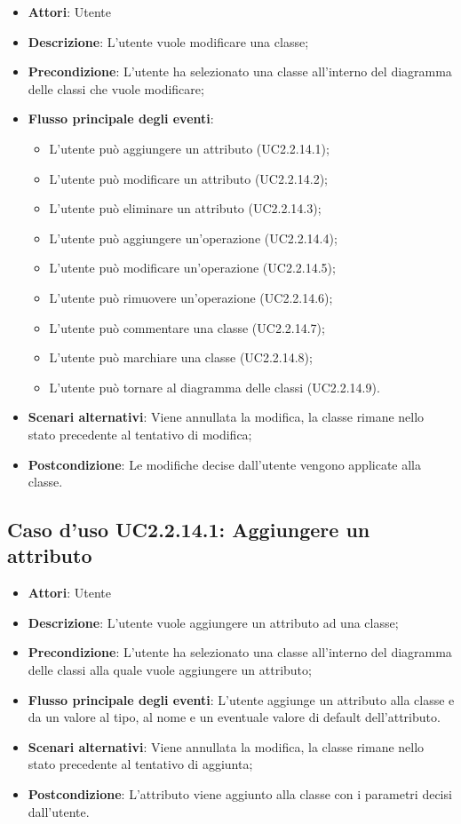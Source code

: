 \documentclass[../AnalisiDeiRequisiti.tex]{subfiles}
\begin{document}
			\begin{itemize}
				\item \textbf{Attori}: Utente
				\item \textbf{Descrizione}: L'utente vuole modificare una classe;
				\item \textbf{Precondizione}: L'utente ha selezionato una classe all'interno del diagramma delle classi che vuole modificare;
				\item \textbf{Flusso principale degli eventi}: \begin{itemize}
					\item L'utente può aggiungere un attributo (UC2.2.14.1);
					\item L'utente può modificare un attributo (UC2.2.14.2);
					\item L'utente può eliminare un attributo (UC2.2.14.3);
					\item L'utente può aggiungere un'operazione (UC2.2.14.4);
					\item L'utente può modificare un'operazione (UC2.2.14.5);
					\item L'utente può rimuovere un'operazione (UC2.2.14.6);
					\item L'utente può commentare una classe (UC2.2.14.7);
					\item L'utente può marchiare una classe (UC2.2.14.8);
					\item L'utente può tornare al diagramma delle classi (UC2.2.14.9).
				\end{itemize}
				\item \textbf{Scenari alternativi}: Viene annullata la modifica, la classe rimane nello stato precedente al tentativo di modifica;
				\item \textbf{Postcondizione}: Le modifiche decise dall'utente vengono applicate alla classe.
			\end{itemize}
			\subsection{Caso d'uso UC2.2.14.1: Aggiungere un attributo}
			\begin{itemize}
				\item \textbf{Attori}: Utente
				\item \textbf{Descrizione}: L'utente vuole aggiungere un attributo ad una classe;
				\item \textbf{Precondizione}: L'utente ha selezionato una classe all'interno del diagramma delle classi alla quale vuole aggiungere un attributo;
				\item \textbf{Flusso principale degli eventi}: L'utente aggiunge un attributo alla classe e da un valore al tipo, al nome e un eventuale valore di default dell'attributo. 
				\item \textbf{Scenari alternativi}: Viene annullata la modifica, la classe rimane nello stato precedente al tentativo di aggiunta;
				\item \textbf{Postcondizione}: L'attributo viene aggiunto alla classe con i parametri decisi dall'utente.
			\end{itemize}
\end{document}
